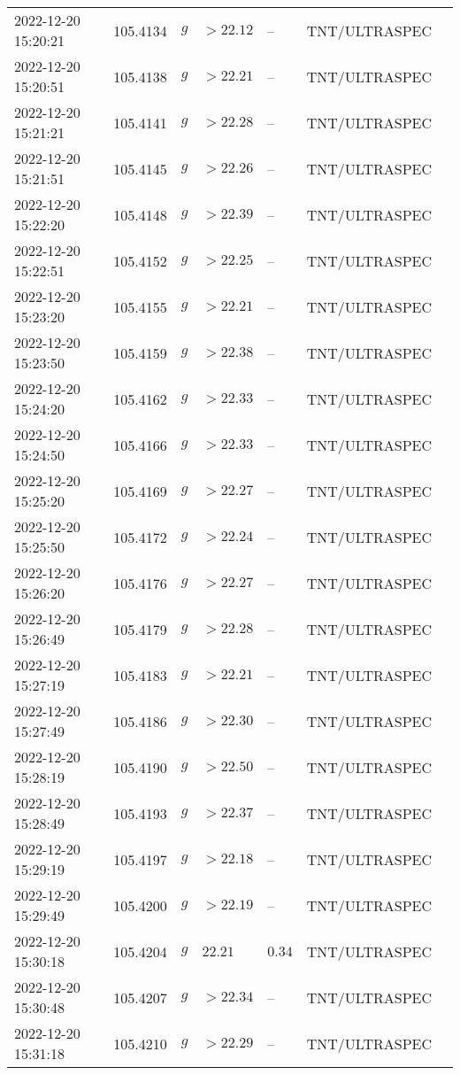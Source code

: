 \documentclass{nature_plusfigure}
\begin{document}
\begin{supplement}
\begin{center}
\begin{longtable}{lllllll}
2022-12-20 15:20:21 & 105.4134 & $g$ & $>22.12$ & -- & TNT/ULTRASPEC &  \\ 
2022-12-20 15:20:51 & 105.4138 & $g$ & $>22.21$ & -- & TNT/ULTRASPEC &  \\ 
2022-12-20 15:21:21 & 105.4141 & $g$ & $>22.28$ & -- & TNT/ULTRASPEC &  \\ 
2022-12-20 15:21:51 & 105.4145 & $g$ & $>22.26$ & -- & TNT/ULTRASPEC &  \\ 
2022-12-20 15:22:20 & 105.4148 & $g$ & $>22.39$ & -- & TNT/ULTRASPEC &  \\ 
2022-12-20 15:22:51 & 105.4152 & $g$ & $>22.25$ & -- & TNT/ULTRASPEC &  \\ 
2022-12-20 15:23:20 & 105.4155 & $g$ & $>22.21$ & -- & TNT/ULTRASPEC &  \\ 
2022-12-20 15:23:50 & 105.4159 & $g$ & $>22.38$ & -- & TNT/ULTRASPEC &  \\ 
2022-12-20 15:24:20 & 105.4162 & $g$ & $>22.33$ & -- & TNT/ULTRASPEC &  \\ 
2022-12-20 15:24:50 & 105.4166 & $g$ & $>22.33$ & -- & TNT/ULTRASPEC &  \\ 
2022-12-20 15:25:20 & 105.4169 & $g$ & $>22.27$ & -- & TNT/ULTRASPEC &  \\ 
2022-12-20 15:25:50 & 105.4172 & $g$ & $>22.24$ & -- & TNT/ULTRASPEC &  \\ 
2022-12-20 15:26:20 & 105.4176 & $g$ & $>22.27$ & -- & TNT/ULTRASPEC &  \\ 
2022-12-20 15:26:49 & 105.4179 & $g$ & $>22.28$ & -- & TNT/ULTRASPEC &  \\ 
2022-12-20 15:27:19 & 105.4183 & $g$ & $>22.21$ & -- & TNT/ULTRASPEC &  \\ 
2022-12-20 15:27:49 & 105.4186 & $g$ & $>22.30$ & -- & TNT/ULTRASPEC &  \\ 
2022-12-20 15:28:19 & 105.4190 & $g$ & $>22.50$ & -- & TNT/ULTRASPEC &  \\ 
2022-12-20 15:28:49 & 105.4193 & $g$ & $>22.37$ & -- & TNT/ULTRASPEC &  \\ 
2022-12-20 15:29:19 & 105.4197 & $g$ & $>22.18$ & -- & TNT/ULTRASPEC &  \\ 
2022-12-20 15:29:49 & 105.4200 & $g$ & $>22.19$ & -- & TNT/ULTRASPEC &  \\ 
2022-12-20 15:30:18 & 105.4204 & $g$ & $22.21$ & $0.34$ & TNT/ULTRASPEC &  \\ 
2022-12-20 15:30:48 & 105.4207 & $g$ & $>22.34$ & -- & TNT/ULTRASPEC &  \\ 
2022-12-20 15:31:18 & 105.4210 & $g$ & $>22.29$ & -- & TNT/ULTRASPEC &  \\ 

\end{longtable}
\end{center}
\end{supplement}
\end{document}
